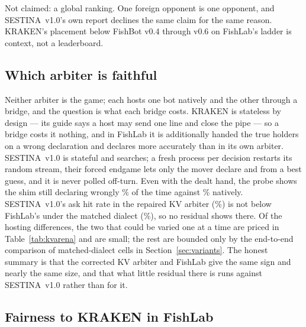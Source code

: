 \documentclass[11pt]{article}
\newcommand{\sestina}{\mbox{SESTINA v1.0}}
\newcommand{\pct}{\%}
\begin{document}
Not claimed: a global ranking. One foreign opponent is one opponent, and \sestina{}'s own report
declines the same claim for the same reason. KRAKEN's placement below FishBot v0.4 through v0.6 on
FishLab's ladder is context, not a leaderboard.

\subsection{Which arbiter is faithful}
\label{sec:faithful}

Neither arbiter is the game; each hosts one bot natively and the other through a bridge, and the
question is what each bridge costs. KRAKEN is stateless by design --- its guide says a host may send
one line and close the pipe --- so a bridge costs it nothing, and in FishLab it is additionally handed
the true holders on a wrong declaration and declares more accurately than in its own arbiter.
\sestina{} is stateful and searches; a fresh process per decision restarts its random stream, their
forced endgame lets only the mover declare and from a best guess, and it is never polled off-turn.
Even with the dealt hand, the probe shows the shim still declaring wrongly \kcPrDealtWrongPct\pct{} of
the time against \kcPrNativeWrongPct\pct{} natively. \sestina{}'s ask hit rate in the repaired KV
arbiter (\kcVDealtAskS\pct{}) is not below FishLab's under the matched dialect
(\kcENoootNcAskB\pct{}), so no residual shows there. Of the hosting differences, the two that could be
varied one at a time are priced in Table~\ref{tab:kvarena} and are small; the rest are bounded only by
the end-to-end comparison of matched-dialect cells in Section~\ref{sec:variants}. The honest summary is
that the corrected KV arbiter and FishLab give the same sign and nearly the same size, and that what
little residual there is runs against \sestina{} rather than for it.

\subsection{Fairness to KRAKEN in FishLab}
\end{document}
